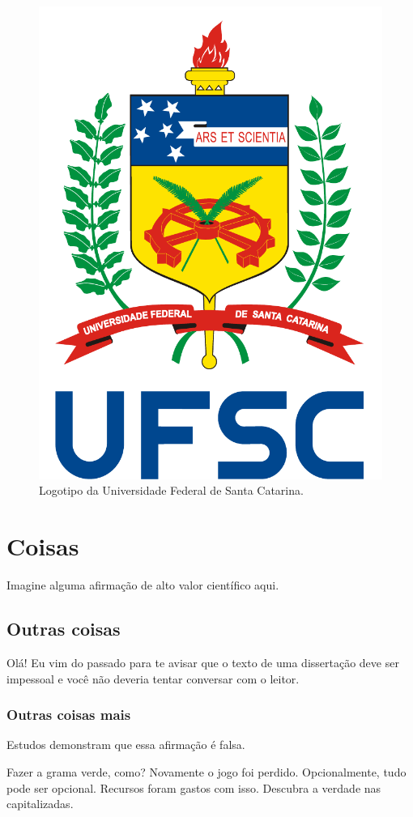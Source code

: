 \documentclass[embeddedlogo]{../ufsc-thesis-rn46-2019}
\begin{document}
\begin{figure}[t]
  \centering
  \caption{Logotipo da Universidade Federal de Santa Catarina.}
  \label{fig:logo}

  \includegraphics[width=.2\linewidth]{../logo-ufsc.pdf}
\end{figure}

\section{Coisas}
\label{sec:stuff}
Imagine alguma afirmação de alto valor científico aqui.

\subsection{Outras coisas}
\label{sec:more}
Olá! Eu vim do passado para te avisar que o texto de uma dissertação deve ser
impessoal e você não deveria tentar conversar com o leitor.

\subsubsection{Outras coisas mais}
\label{sec:yet-more}
Estudos demonstram que essa afirmação é falsa.

\label{sec:yet-another}
Fazer a grama verde, como? Novamente o jogo foi perdido. Opcionalmente, tudo
pode ser opcional. Recursos foram gastos com isso. Descubra a verdade nas
capitalizadas.


\postextual

\end{document}

